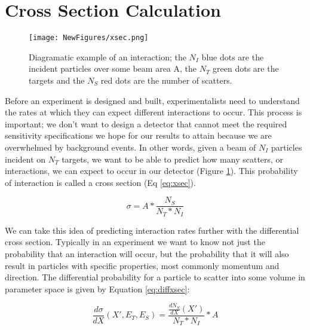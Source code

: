 \documentclass[12pt]{article}
\begin{document}
\newpage
\section {Cross Section Calculation}

\begin{figure}[H]
\centering
\texttt{[image: NewFigures/xsec.png]}
\caption{ Diagramatic example of an interaction; the $N_I$ blue dots are the incident particles over some beam area A, the $N_T$ green dots are the targets and the $N_S$ red dots are the number of scatters.}  
\label{fig:Xsec}
\end{figure}

Before an experiment is designed and built, experimentalists need to understand the rates at which they can expect different interactions to occur. This process is important; we don't want to design a detector that cannot meet the required sensitivity specifications we hope for our results to attain because we are overwhelmed by background events. In other words, given a beam of $N_I$ particles incident on $N_T$ targets, we want to be able to predict how many scatters, or interactions, we can expect to occur in our detector (Figure \ref{fig:Xsec}). This probability of interaction is called a cross section (Eq \ref{eq:xsec}). 

\begin{equation}
\sigma = A * \frac{N_S}{N_T * N_I}
\label{eq:xsec}
\end{equation}


\par We can take this idea of predicting interaction rates further with the differential cross section.  Typically in an experiment we want to know not just the probability that an interaction will occur, but the probability that it will also result in particles with specific properties, most commonly momentum and direction. The differential probability for a particle to scatter into some volume in parameter space is given by Equation \ref{eq:diffxsec}:

\begin{equation}
\frac{d\sigma}{dX}(X',E_T,E_S) = \frac{\frac{dN_S}{dX}(X')}{N_T*N_I} * A 
\label{eq:diffxsec}
\end{equation}
\end{document}
